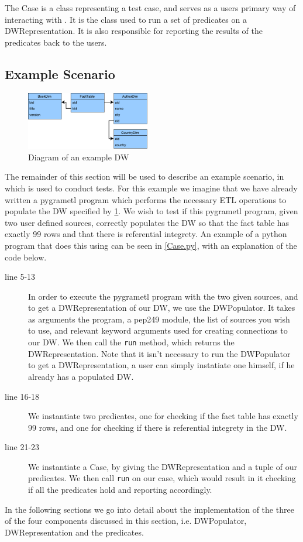 The Case is a class representing a test case, and serves as a users primary way of interacting with \FW{}. It is the class used to run a set of predicates on a DWRepresentation. It is also responsible for reporting the results of the predicates back to the users.


\subsection{Example Scenario}

\begin{figure}
\centering
\includegraphics[width=0.48\textwidth]{figures/example_dw.pdf}
\caption{Diagram of an example DW}
\label{fig:exdw}
\end{figure}

The remainder of this section will be used to describe an example scenario, in which \FW{} is used to conduct tests. For this example we imagine that we have already written a pygrametl program which performs the necessary ETL operations to populate the DW specified by \cref{fig:exdw}. We wish to test if this pygrametl program, given two user defined sources, correctly populates the DW so that the fact table has exactly 99 rows and that there is referential integrety.
An example of a python program that does this using \FW{} can be seen in \cref{Case.py}, with an explanation of the code below.


\begin{description}
\item[line 5-13] In order to execute the pygrametl program with the two given sources, and to get a DWRepresentation of our DW, we use the DWPopulator. It takes as arguments the program, a pep249 module, the list of sources you wish to use, and relevant keyword arguments used for creating connections to our DW. We then call the \texttt{run} method, which returns the DWRepresentation. Note that it isn't necessary to run the DWPopulator to get a DWRepresentation, a user can simply instatiate one himself, if he already has a populated DW.
\item[line 16-18] We instantiate two predicates, one for checking if the fact table has exactly 99 rows, and one for checking if there is referential integrety in the DW.
  \item[line 21-23] We instantiate a Case, by giving the DWRepresentation and a tuple of our predicates. We then call \texttt{run} on our case, which would result in it checking if all the predicates hold and reporting accordingly. 
\end{description}


In the following sections we go into detail about the implementation of the three of the four components discussed in this section, i.e. DWPopulator, DWRepresentation and the predicates.








